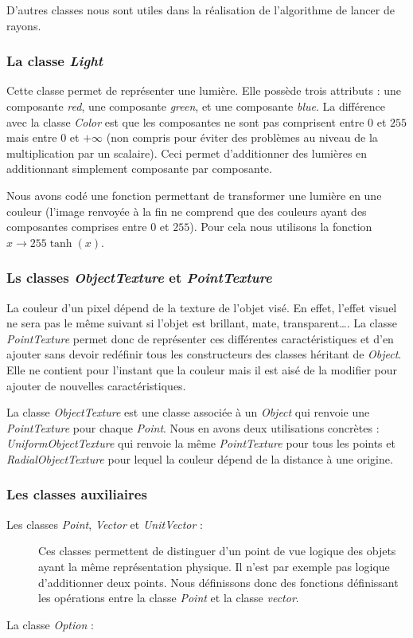\documentclass{article}
\begin{document}
D'autres classes nous sont utiles dans la réalisation de l'algorithme de lancer de rayons.

\subsubsection{La classe \emph{Light}}
Cette classe permet de représenter une lumi\`ere. Elle possède trois attributs : une composante \emph{red}, une composante \emph{green}, et une composante \emph{blue}.
La différence avec la classe \emph{Color} est que les composantes ne sont pas comprisent entre $0$ et $255$ mais entre $0$ et $+\infty$ (non compris pour \'eviter des probl\`emes au niveau de la multiplication par un scalaire).
Ceci permet d'additionner des lumières en additionnant simplement composante par composante.


Nous avons codé une fonction permettant de transformer une lumière en une couleur (l'image renvoyée à la fin ne comprend que des couleurs ayant des composantes comprises entre $0$ et $255$). Pour cela nous utilisons la fonction $x \rightarrow 255\tanh(x)$. 

\subsubsection{Ls classes \emph{ObjectTexture} et \emph{PointTexture}}
	La couleur d'un pixel dépend de la texture de l'objet visé. En effet, l'effet visuel ne sera pas le même suivant si l'objet est brillant, mate, transparent\dots. La classe \emph{PointTexture} permet donc de représenter ces différentes caractéristiques et d'en ajouter sans devoir red\'efinir tous les constructeurs des classes h\'eritant de \emph{Object}. Elle ne contient pour l'instant que la couleur mais il est ais\'e de la modifier pour ajouter de nouvelles caract\'eristiques.
	
	La classe \emph{ObjectTexture} est une classe associ\'ee \`a un \emph{Object} qui renvoie une \emph{PointTexture} pour chaque \emph{Point}. Nous en avons deux utilisations concr\`etes : \emph{UniformObjectTexture} qui renvoie la m\^eme \emph{PointTexture} pour tous les points et \emph{RadialObjectTexture} pour lequel la couleur d\'epend de la distance \`a une origine.

\subsubsection{Les classes auxiliaires}
	\begin{description}
		\item[Les classes \emph{Point}, \emph{Vector} et \emph{UnitVector} : ]
Ces classes permettent de distinguer d'un point de vue logique des objets ayant la m\^eme repr\'esentation physique. Il n'est par exemple pas logique d'additionner deux points. Nous définissons donc des fonctions définissant les opérations entre la classe \emph{Point} et la classe \emph{vector}.

		\item[La classe \emph{Option} : ]
	\end{description}
  
\end{document}
